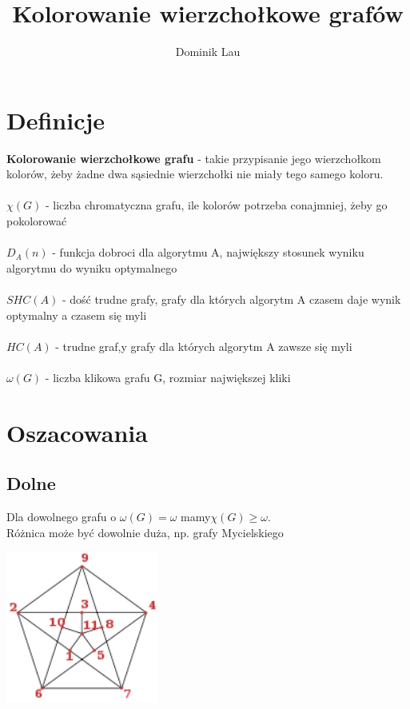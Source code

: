 \documentclass{article}
\title{Kolorowanie wierzchołkowe grafów}
\author{Dominik Lau}
\begin{document}
\maketitle

\section{Definicje}

\textbf{Kolorowanie wierzchołkowe grafu} - takie przypisanie jego wierzchołkom kolorów, żeby żadne dwa sąsiednie wierzchołki nie miały tego samego koloru. \\\\
$\chi(G)$ - liczba chromatyczna grafu, ile kolorów potrzeba conajmniej, żeby go pokolorować \\\\
$D_A(n)$ - funkcja dobroci dla algorytmu A, największy stosunek wyniku algorytmu do wyniku optymalnego \\\\
$SHC(A)$ - dość trudne grafy,  grafy dla których algorytm A czasem daje wynik optymalny a czasem się myli \\\\
$HC(A)$ - trudne graf,y  grafy dla których algorytm A zawsze się myli \\\\
$\omega(G)$ - liczba klikowa grafu G, rozmiar największej kliki

\section{Oszacowania}

\subsection{Dolne}
Dla dowolnego grafu o $\omega(G) = \omega$ mamy$ \chi(G) \ge \omega $. \\
Różnica może być dowolnie duża,  np. grafy Mycielskiego

\begin{center}
\includegraphics[width=5cm]{Mycielski}
\end{center}
\end{document}
